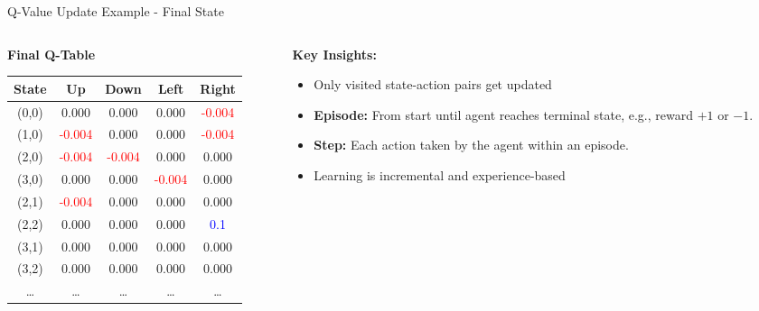 \documentclass[aspectratio=169]{beamer}
\begin{document}





\begin{frame}{Q-Value Update Example - Final State}
    
    \begin{columns}
        \begin{column}{0.6\textwidth}
            \textbf{Final Q-Table}
            \small
            \begin{table}[h]
                \centering
                \begin{tabular}{|c|c|c|c|c|}
                    \hline
                    \textbf{State} & \textbf{Up} & \textbf{Down} & \textbf{Left} & \textbf{Right} \\
                    \hline
                    (0,0) & 0.000 & 0.000 & 0.000 & \textcolor{red}{-0.004} \\
                    (1,0) & \textcolor{red}{-0.004} & 0.000 & 0.000 & \textcolor{red}{-0.004} \\
                    (2,0) & \textcolor{red}{-0.004} & \textcolor{red}{-0.004} & 0.000 & 0.000 \\
                    (3,0) & 0.000 & 0.000 & \textcolor{red}{-0.004} & 0.000 \\
                    (2,1) & \textcolor{red}{-0.004} & 0.000 & 0.000 & 0.000 \\
                    (2,2) & 0.000 & 0.000 & 0.000 & \textcolor{blue}{0.1} \\
                    (3,1) & 0.000 & 0.000 & 0.000 & 0.000 \\
                    (3,2) & 0.000 & 0.000 & 0.000 & 0.000 \\
                    \dots & \dots & \dots & \dots & \dots \\
                    \hline
                \end{tabular}
            \end{table}
        \end{column}
        
        \begin{column}{0.4\textwidth}
            \textbf{Key Insights:}
            \begin{itemize}
                \item Only visited state-action pairs get updated
                \item \textbf{Episode:} From start until agent reaches terminal state, e.g., reward $+1$ or $-1$.
                \item \textbf{Step:} Each action taken by the agent within an episode.
                \item Learning is incremental and experience-based
            \end{itemize}
            
        \end{column}
    \end{columns}
\end{frame}
\end{document}
